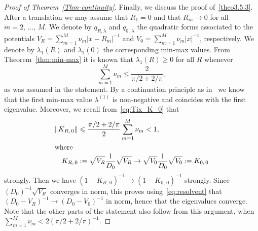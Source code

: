\documentclass[10pt]{amsart}
\theoremstyle{definition}
\newcommand\1{{\ensuremath {\mathds 1} }}
\renewcommand{\geq}{\geqslant}
\renewcommand{\leq}{\leqslant}
\begin{document}
\begin{proof}[Proof of Theorem~\ref{Thm-continuity}]
Finally, we discuss the proof of~\eqref{theo3.5.3}. After a translation we may assume that $R_1=0$ and that $R_m\to0$ for all $m=2,\,\dots,\,M$. We denote by $q_{R,\lambda}$ and $q_{0,\,\lambda}$ the quadratic forms associated to the potentials $V_R=\sum_{m=1}^M\nu_m|x-R_m|^{-1}$ and $V_0=\sum_{m=1}^M\nu_m|x|^{-1}$, respectively. We denote by $\lambda_1(R)$ and $\lambda_1(0)$ the corresponding min-max values. From Theorem~\ref{thm:min-max} it is known that $\lambda_1(R)\geq0$ for all $R$ whenever
\[
\sum_{m=1}^M\nu_m\leq\frac2{\pi/2+2/\pi},
\]
as was assumed in the statement. By a continuation principle as in~\cite{DolEstSer-00} we know that the first min-max value $\lambda^{(1)}$ is non-negative and coincides with the first eigenvalue. Moreover, we recall from~\eqref{eq:Tix_K_0} that
\begin{align*}
\left\|K_{R,\,0}\right\|&\leq \frac{\pi/2+2/\pi}2\sum_{m=1}^M\nu_m<1,
\\
\intertext{where}
K_{R,\,0}&:=\sqrt{V_R}\frac{1}{D_0}\sqrt{V_R}\to \sqrt{V_0}\frac1{D_0}\sqrt{V_0}:=K_{0,\,0}
\end{align*}
strongly. Then we have $(1-K_{R,\,0})^{-1}\to (1-K_{0,\,0})^{-1}$ strongly. Since $(D_0)^{-1}\sqrt{V_R}$ converges in norm, this proves using~\eqref{eq:resolvent} that $(D_0-V_R)^{-1}\to (D_0-V_0)^{-1}$ in norm, hence that the eigenvalues converge. Note that the other parts of the statement also follow from this argument, when $\sum_{m=1}^M\nu_m< 2(\pi/2+2/\pi)^{-1}$.
\end{proof}

\vspace{12pt}
\end{document}
